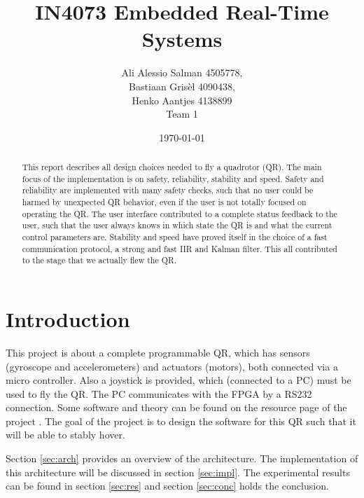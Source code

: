 \documentclass[a4paper]{article}
\title{\textbf{IN4073 Embedded Real-Time Systems}}
\author{Ali Alessio Salman 4505778, \\Bastiaan Gris\`el 4090438, \\Henko Aantjes 4138899\\Team 1}
\date{\today}
\begin{document}
\maketitle

\begin{abstract}
This report describes all design choices needed to fly a quadrotor (QR). The main focus of the implementation is on safety, reliability, stability and speed. Safety and reliability are implemented with many safety checks, such that no user could be harmed by unexpected QR behavior, even if the user is not totally focused on operating the QR. The user interface contributed to a complete status feedback to the user, such that the user always knows in which state the QR is and what the current control parameters are. Stability and speed have proved itself in the choice of a fast communication protocol, a strong and fast IIR and Kalman filter. This all contributed to the stage that we actually flew the QR.
\end{abstract}

\newpage
\tableofcontents
\newpage

\section{Introduction}
This project is about a complete programmable QR, which has sensors (gyroscope and accelerometers) and actuators (motors), both connected via a micro controller. Also a joystick is provided, which (connected to a PC) must be used to fly the QR. The PC communicates with the FPGA by a RS232 connection. Some software and theory can be found on the resource page of the project \cite{resourcesERTS}. The goal of the project is to design the software for this QR such that it will be able to stably hover.

Section \ref{sec:arch} provides an overview of the architecture. The implementation of this architecture will be discussed in section \ref{sec:impl}. The experimental results can be found in section \ref{sec:res} and section \ref{sec:conc} holds the conclusion.
\end{document}
